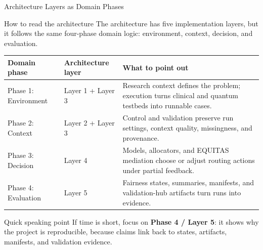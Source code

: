 
\begin{frame}{Architecture Layers as Domain Phases}
\small

\begin{block}{How to read the architecture}
The architecture has five implementation layers, but it follows the same four-phase domain logic: environment, context, decision, and evaluation.
\end{block}

\vspace{0.25em}

\begin{tabular}{p{}p{}p{}}
\toprule
\textbf{Domain phase} & \textbf{Architecture layer} & \textbf{What to point out} \\
\midrule
\rowcolor{phase1blue!12}
Phase 1: Environment & Layer 1 + Layer 3 & Research context defines the problem; execution turns clinical and quantum testbeds into runnable cases. \\

\rowcolor{phase2green!12}
Phase 2: Context & Layer 2 + Layer 3 & Control and validation preserve run settings, context quality, missingness, and provenance. \\

\rowcolor{phase3orange!12}
Phase 3: Decision & Layer 4 & Models, allocators, and EQUITAS mediation choose or adjust routing actions under partial feedback. \\

\rowcolor{phase4purple!12}
Phase 4: Evaluation & Layer 5 & Fairness states, summaries, manifests, and validation-hub artifacts turn runs into evidence. \\
\bottomrule
\end{tabular}

\vspace{0.35em}

\begin{block}{Quick speaking point}
If time is short, focus on \textbf{Phase 4 / Layer 5}: it shows why the project is reproducible, because claims link back to states, artifacts, manifests, and validation evidence.
\end{block}

\end{frame}
